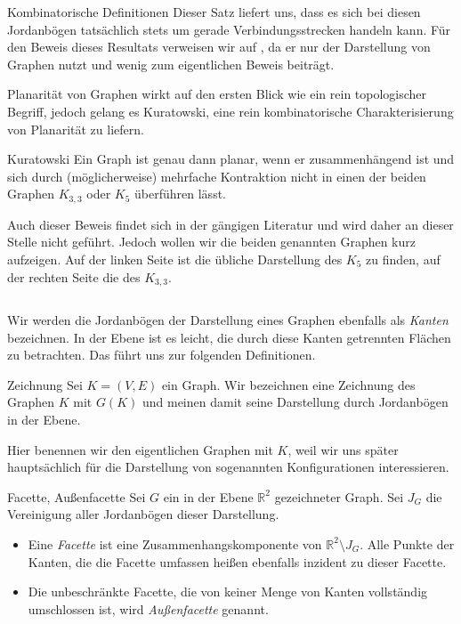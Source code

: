 \begin{section}{Kombinatorische Definitionen}
  Dieser Satz liefert uns, dass es sich bei diesen Jordanbögen tatsächlich stets um gerade Verbindungsstrecken handeln kann. Für den Beweis dieses Resultats verweisen wir auf \cite[Seite 113]{fritsch}, da er nur der Darstellung von Graphen nutzt und wenig zum eigentlichen Beweis beiträgt. 
  
  Planarität von Graphen wirkt auf den ersten Blick wie ein rein topologischer Begriff, jedoch gelang es Kuratowski, eine rein kombinatorische Charakterisierung von Planarität zu liefern.
  
  \begin{satz}{Kuratowski}
   Ein Graph ist genau dann planar, wenn er zusammenhängend ist und sich durch (möglicherweise) mehrfache Kontraktion nicht in einen der beiden Graphen $K_{3,3}$ oder $K_5$ überführen lässt.
  \end{satz}
  
  Auch dieser Beweis findet sich in der gängigen Literatur und wird daher an dieser Stelle nicht geführt. Jedoch wollen wir die beiden genannten Graphen kurz aufzeigen. Auf der linken Seite ist die übliche Darstellung des $K_5$ zu finden, auf der rechten Seite die des $K_{3,3}$.
  
  \[  \]

  Wir werden die Jordanbögen der Darstellung eines Graphen ebenfalls als \textit{Kanten} bezeichnen. In der Ebene ist es leicht, die durch diese Kanten getrennten Flächen zu betrachten. Das führt uns zur folgenden Definitionen.
  
  \begin{definition}{Zeichnung}
    Sei $K=(V,E)$ ein Graph. Wir bezeichnen eine Zeichnung des Graphen $K$ mit $G(K)$ und meinen damit seine Darstellung durch Jordanbögen in der Ebene.
  \end{definition}
  
  Hier benennen wir den eigentlichen Graphen mit $K$, weil wir uns später hauptsächlich für die Darstellung von sogenannten Konfigurationen interessieren.

  \begin{definition}{Facette, Außenfacette}
   Sei $G$ ein in der Ebene $\mathbb{R}^2$ gezeichneter Graph. Sei $J_G$ die Vereinigung aller Jordanbögen dieser Darstellung.
   \begin{itemize}
   \item Eine \textit{Facette} ist eine Zusammenhangskomponente von $\mathbb{R}^2 \setminus J_G$. Alle Punkte der Kanten, die die Facette umfassen heißen ebenfalls inzident zu dieser Facette. 
   \item Die unbeschränkte Facette, die von keiner Menge von Kanten vollständig umschlossen ist, wird \textit{Außenfacette} genannt.
   \end{itemize}
  \end{definition}
  

\end{section}
